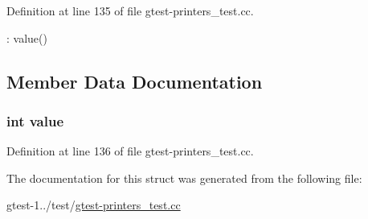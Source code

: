 \-Definition at line 135 of file gtest-\/printers\-\_\-test.\-cc.


\begin{DoxyCode}
: value() {}
\end{DoxyCode}


\subsection{\-Member \-Data \-Documentation}
\hypertarget{structfoo_1_1PrintableViaPrintTo_ac4f474c82e82cbb89ca7c36dd52be0ed}{
\subsubsection[{value}]{\setlength{\rightskip}{0pt plus 5cm}int {\bf value}}}\label{d9/d3a/structfoo_1_1PrintableViaPrintTo_ac4f474c82e82cbb89ca7c36dd52be0ed}


\-Definition at line 136 of file gtest-\/printers\-\_\-test.\-cc.



\-The documentation for this struct was generated from the following file\-:\begin{DoxyCompactItemize}
\item 
gtest-\/1../test/\hyperlink{gtest-printers__test_8cc}{gtest-\/printers\-\_\-test.\-cc}\end{DoxyCompactItemize}
